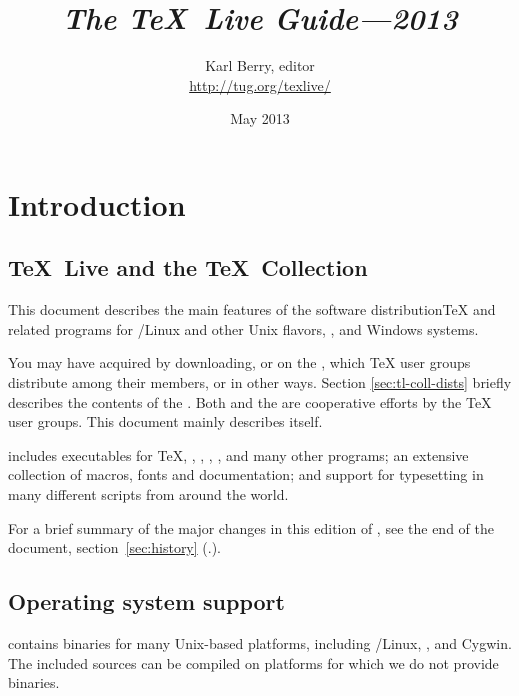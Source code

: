 \documentclass{article}
\begin{document}
\title{%
  {\huge \textit{The \TeX\ Live Guide---2013}}
}

\author{Karl Berry, editor \\[3mm]
        \url{http://tug.org/texlive/}
       }

\date{May 2013}

\maketitle

\begin{multicols}{2}
\tableofcontents
\end{multicols}

\section{Introduction}
\label{sec:intro}

\subsection{\TeX\ Live and the \TeX\ Collection}

This document describes the main features of the \TL{} software
distribution\Dash \TeX{} and related programs for \GNU/Linux
and other Unix flavors, \MacOSX, and Windows systems.

You may have acquired \TL{} by downloading, or on the \TK{} \DVD, which
\TeX{} user groups distribute among their members, or in other ways.
Section \ref{sec:tl-coll-dists} briefly describes the contents of the
\DVD.  Both \TL{} and the \TK{} are cooperative efforts by the \TeX{}
user groups. This document mainly describes \TL{} itself.

\TL{} includes executables for \TeX{}, \LaTeXe{}, \ConTeXt,
\MF, \MP, \BibTeX{} and many other programs; an extensive collection
of macros, fonts and documentation; and support for typesetting in
many different scripts from around the world.

For a brief summary of the major changes in this edition of \TL{},
see the end of the document, section~\ref{sec:history}
(\p.\pageref{sec:history}).


\subsection{Operating system support}
\label{sec:os-support}

\TL{} contains binaries for many Unix-based platforms, including
\GNU/Linux, \MacOSX, and Cygwin.  The included sources can be compiled
on platforms for which we do not provide binaries.
\end{document}
